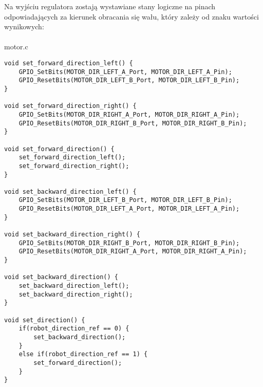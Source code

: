\documentclass[a4paper,12pt,twoside,openany]{report}
\begin{document}
Na wyjściu regulatora zostają wystawiane stany logiczne na pinach odpowiadających za kierunek obracania się wału, który zależy od znaku wartości wynikowych:\\
\\
motor.c
\begin{lstlisting}[style=customc]
void set_forward_direction_left() {
	GPIO_SetBits(MOTOR_DIR_LEFT_A_Port, MOTOR_DIR_LEFT_A_Pin);
	GPIO_ResetBits(MOTOR_DIR_LEFT_B_Port, MOTOR_DIR_LEFT_B_Pin);
}

void set_forward_direction_right() {
	GPIO_SetBits(MOTOR_DIR_RIGHT_A_Port, MOTOR_DIR_RIGHT_A_Pin);
	GPIO_ResetBits(MOTOR_DIR_RIGHT_B_Port, MOTOR_DIR_RIGHT_B_Pin);
}

void set_forward_direction() {
	set_forward_direction_left();
	set_forward_direction_right();
}

void set_backward_direction_left() {
	GPIO_SetBits(MOTOR_DIR_LEFT_B_Port, MOTOR_DIR_LEFT_B_Pin);
	GPIO_ResetBits(MOTOR_DIR_LEFT_A_Port, MOTOR_DIR_LEFT_A_Pin);
}

void set_backward_direction_right() {
	GPIO_SetBits(MOTOR_DIR_RIGHT_B_Port, MOTOR_DIR_RIGHT_B_Pin);
	GPIO_ResetBits(MOTOR_DIR_RIGHT_A_Port, MOTOR_DIR_RIGHT_A_Pin);
}

void set_backward_direction() {
	set_backward_direction_left();
	set_backward_direction_right();
}

void set_direction() {
	if(robot_direction_ref == 0) {
		set_backward_direction();
	}
	else if(robot_direction_ref == 1) {
		set_forward_direction();
	}
}
\end{lstlisting}
\end{document}
